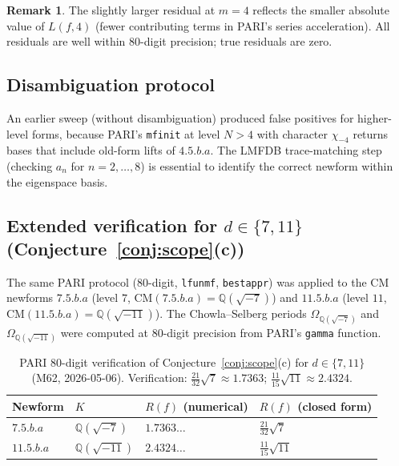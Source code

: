 \documentclass[10pt]{article}
\theoremstyle{definition}
\newtheorem{remark}[theorem]{Remark}
\newcommand{\Q}{\mathbb{Q}}
\begin{document}
\begin{remark}
The slightly larger residual at $m=4$ reflects the smaller absolute value of
$L(f,4)$ (fewer contributing terms in PARI's series acceleration).  All
residuals are well within $80$-digit precision; true residuals are zero.
\end{remark}

\subsection{Disambiguation protocol}

An earlier sweep (without disambiguation) produced false positives for higher-level
forms, because PARI's \texttt{mfinit} at level $N > 4$ with character $\chi_{-4}$
returns bases that include old-form lifts of $4.5.b.a$.  The LMFDB trace-matching
step (checking $a_n$ for $n = 2,\ldots,8$) is essential to identify the correct
newform within the eigenspace basis.

\subsection{Extended verification for \texorpdfstring{$d \in \{7, 11\}$}{d in 7, 11}
(Conjecture~\ref{conj:scope}(c))}

The same PARI protocol (80-digit, \texttt{lfunmf}, \texttt{bestappr}) was applied
to the CM newforms $7.5.b.a$ (level $7$, $\mathrm{CM}(\mathit{7.5.b.a}) = \Q(\sqrt{-7})$)
and $11.5.b.a$ (level $11$, $\mathrm{CM}(\mathit{11.5.b.a}) = \Q(\sqrt{-11})$).
The Chowla--Selberg periods $\Omega_{\Q(\sqrt{-7})}$ and $\Omega_{\Q(\sqrt{-11})}$
were computed at 80-digit precision from PARI's \texttt{gamma} function.

\begin{table}[h]
\centering
\begin{tabular}{llll}
\hline
Newform & $K$ & $R(f)$ (numerical) & $R(f)$ (closed form)\\
\hline
$7.5.b.a$ & $\Q(\sqrt{-7})$ & $1.7363\ldots$ & $\tfrac{21}{32}\sqrt{7}$ \\
$11.5.b.a$ & $\Q(\sqrt{-11})$ & $2.4324\ldots$ & $\tfrac{11}{15}\sqrt{11}$ \\
\hline
\end{tabular}
\caption{PARI 80-digit verification of Conjecture~\ref{conj:scope}(c) for $d \in \{7, 11\}$
(M62, 2026-05-06). Verification: $\tfrac{21}{32}\sqrt{7} \approx 1.7363$;
$\tfrac{11}{15}\sqrt{11} \approx 2.4324$.}
\label{tab:d711}
\end{table}
\end{document}
